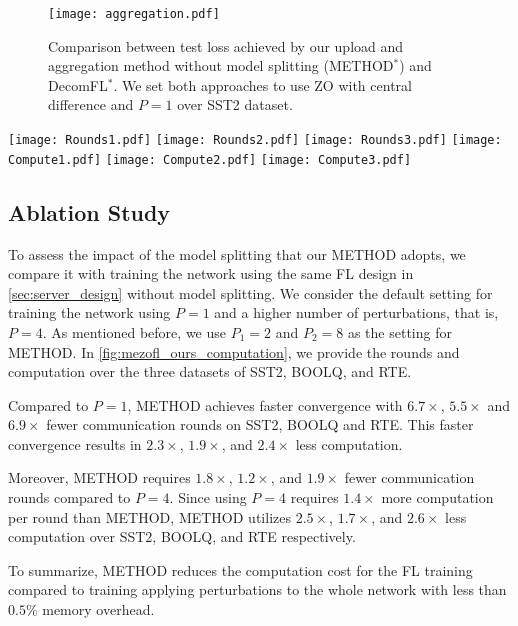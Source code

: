 \begin{figure}
    \centering
    \texttt{[image: aggregation.pdf]}
    \caption{Comparison between test loss achieved by our upload and aggregation method without model splitting (\ac{METHOD}$^{*}$) and DecomFL$^*$. We set both approaches to use \ac{ZO} with central difference and $P=1$ over SST2 dataset. }
    \label{fig:DecomFL_zo}
\end{figure}








\begin{figure*}
    \centering
    \texttt{[image: Rounds1.pdf]}
    \texttt{[image: Rounds2.pdf]}
    \texttt{[image: Rounds3.pdf]}
    \texttt{[image: Compute1.pdf]}
    \texttt{[image: Compute2.pdf]}
    \texttt{[image: Compute3.pdf]}
    \caption{Computation vs test loss comparison between \ac{METHOD} (ours) and using ZO without model splitting for $P=1$ and $P=4$ for client training. The three methods use the same \ac{FL} design of \ac{METHOD}. }
    \label{fig:mezofl_ours_computation}    
\end{figure*}

\subsection{Ablation Study}
To assess the impact of the model splitting that our \ac{METHOD} adopts, we compare it with training the network using the same \ac{FL} design in \cref{sec:server_design} without model splitting. We consider the default setting for training the network using $P=1$ and a higher number of perturbations, that is, $P=4$. As mentioned before, we use $P_{1}=2$ and $P_{2}=8$ as the setting for \ac{METHOD}.
In \cref{fig:mezofl_ours_computation}, we provide the rounds and computation over the three datasets of SST2, BOOLQ, and RTE.

Compared to $P=1$, \ac{METHOD} achieves faster convergence with $6.7\times$, $5.5\times$ and $6.9\times$ fewer communication rounds on SST2, BOOLQ and RTE. This faster convergence results in $2.3\times$, $1.9\times$, and $2.4\times$ less computation. 

Moreover, \ac{METHOD} requires $1.8\times$, $1.2\times$, and $1.9\times$ fewer communication rounds compared to $P=4$. Since using $P=4$ requires $1.4\times$ more computation per round than \ac{METHOD}, \ac{METHOD} utilizes $2.5\times$, $1.7\times$, and $2.6\times$ less computation over SST2, BOOLQ, and RTE respectively.  

To summarize, \ac{METHOD} reduces the computation cost for the \ac{FL} training compared to training applying perturbations to the whole network with less than $0.5\%$ memory overhead.   


